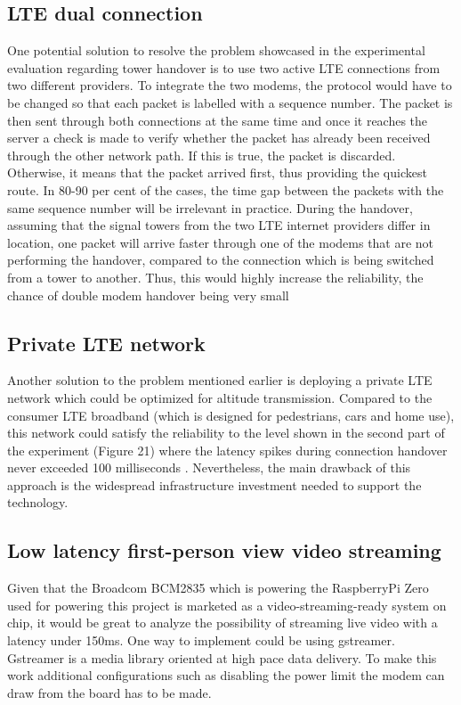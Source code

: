 \documentclass{IEEEtran}
\begin{document}
\subsection{LTE dual connection}
One potential solution to resolve the problem showcased in the experimental evaluation regarding tower handover is to use two active LTE connections from two different providers. To integrate the two modems, the protocol would have to be changed so that each packet is labelled with a sequence number. The packet is then sent through both connections at the same time and once it reaches the server a check is made to verify whether the packet has already been received through the other network path. If this is true, the packet is discarded. Otherwise, it means that the packet arrived first, thus providing the quickest route. In 80-90 per cent of the cases, the time gap between the packets with the same sequence number will be irrelevant in practice. During the handover, assuming that the signal towers from the two LTE internet providers differ in location, one packet will arrive faster through one of the modems that are not performing the handover, compared to the connection which is being switched from a tower to another. Thus, this would highly increase the reliability, the chance of double modem handover being very small \citep{nguyen_2018_how}
\subsection{Private LTE network}
Another solution to the problem mentioned earlier is deploying a private LTE network which could be optimized for altitude transmission. Compared to the consumer LTE broadband (which is designed for pedestrians, cars and home use), this network could satisfy the reliability to the level shown in the second part of the experiment (Figure 21) where the latency spikes during connection handover never exceeded 100 milliseconds \citep{amorim_2017_radio}. Nevertheless, the main drawback of this approach is the widespread infrastructure investment needed to support the technology.

\subsection{Low latency first-person view video streaming}
Given that the Broadcom BCM2835 which is powering the RaspberryPi Zero used for powering this project is marketed as a video-streaming-ready system on chip, it would be great to analyze the possibility of streaming live video with a latency under 150ms. One way to implement could be using gstreamer. Gstreamer is a media library oriented at high pace data delivery. To make this work additional configurations such as disabling the power limit the modem can draw from the board has to be made. 
\end{document}
